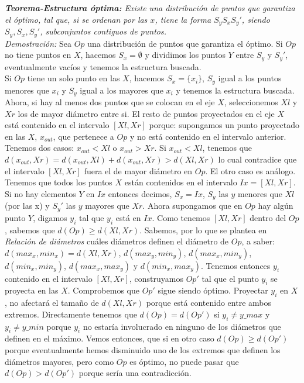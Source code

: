 \documentclass{article}
\begin{document}
\textit{ \textbf{Teorema-Estructura \'optima:} Existe una distribuci\'on de puntos que garantiza el \'optimo, tal que, si se ordenan por las $x$, tiene la forma $S_yS_xS_y'$, siendo $S_y,S_x,S_y'$, subconjuntos contiguos de puntos.}\\
\textit{Demostraci\'on:} Sea $Op$ una distribuci\'on de puntos que garantiza el \'optimo. Si $Op$ no tiene puntos en $X$, hacemos  $S_x=\emptyset $ y dividimos los puntos $Y$ entre $S_y$ y $S_y'$, eventualmente vac\'ios y tenemos la estructura buscada.\\
Si $Op$ tiene un solo punto en las $X$, hacemos $S_x=\{x_i\}$, $S_y$ igual a los puntos menores que $x_i$ y $S_y$ igual a los mayores que $x_i$ y tenemos la estructura buscada.\\
Ahora, si hay al menos dos puntos que se colocan en el eje $X$, seleccionemos $Xl$ y $Xr$ los de mayor di\'ametro entre si. El resto de puntos proyectados en el eje $X$ est\'a contenido en el intervalo $[Xl,Xr]$ porque:
supongamos un punto proyectado en las $X$, $x_{out}$, que pertenece a $Op$ y no est\'a contenido en el intervalo anterior. Tenemos dos casos: $x_{out} < Xl$ o $x_{out} > Xr$. Si $x_{out}< Xl$, tenemos que $d(x_{out}, Xr) = d(x_{out}, Xl) + d(x_{out}, Xr) > d(Xl, Xr)$ 
lo cual contradice que el intervalo $[Xl,Xr]$ fuera el de mayor di\'ametro en $Op$. El otro caso es an\'alogo. \\
Tenemos que todos los puntos $X$ est\'an contenidos en el intervalo $Ix = [Xl,Xr]$. Si no hay elementos $Y$ en $Ix$ entonces decimos, $S_x=Ix$, $S_y$ las $y$ menores que $Xl$(por las x) y $S_y'$ las $y$ mayores que $Xr$. Ahora supongamos que en $Op$ hay alg\'un punto $Y$, digamos $y_i$ tal que $y_i$ est\'a en $Ix$. Como tenemos $[Xl,Xr]$ dentro del $Op$, sabemos que $d(Op)\geq d(Xl,Xr)$. Sabemos, por lo que se plantea en \textit{Relaci\'on de di\'ametros} cu\'ales di\'ametros definen el di\'ametro de $Op$, a saber: $d(max_x, min_x)=d(Xl,Xr)$, $d(max_y, min_y)$, $d(max_x, min_y)$, $d(min_x, min_y)$, $d(max_x, max_y)$ y $d(min_x, max_y)$.
Tenemos entonces $y_i$ contenido en el intervalo $[Xl,Xr]$, construyamos $Op'$ tal que el punto $y_i$ se proyecta en las $X$. Comprobemos que $Op'$ sigue siendo \'optimo. Proyectar $y_i$ en $X$, no afectar\'a el tama\~no de $d(Xl,Xr)$ porque est\'a contenido entre ambos extremos. Directamente tenemos que $d(Op)=d(Op')$ si $y_i\neq y\_max$ y $y_i \neq y\_min$ porque $y_i$ no estar\'ia involucrado en ninguno de los di\'ametros que definen en el m\'aximo. Vemos entonces, que si en otro caso $d(Op)\geq d(Op')$ porque eventualmente hemos disminuido uno de los extremos que definen los di\'ametros mayores, pero como $Op$ es \'optimo, no puede pasar que $d(Op)>d(Op')$ porque ser\'ia una contradicci\'on.\\
\end{document}
